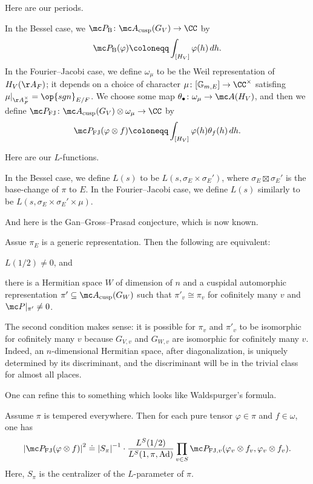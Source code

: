 \documentclass{article}
\begin{document}
Here are our periods.
\begin{definition}
	In the Bessel case, we $\mc P_{\mathrm B}\colon\mc A_{\mathrm{cusp}}(G_V)\to\CC$ by
	\[\mc P_{\mathrm B}(\varphi)\coloneqq\int_{[H_V]}\varphi(h)\,dh.\]
	In the Fourier--Jacobi case, we define $\omega_\mu$ to be the Weil representation of $H_V(\AA_F)$; it depends on a choice of character $\mu\colon[\mathbb G_{m,E}]\to\CC^\times$ satisfing $\mu|_{\AA_F^\times}=\op{sgn}_{E/F}$. We choose some map $\theta_\bullet\colon\omega_\mu\to\mc A(H_V)$, and then we define $\mc P_{\mathrm{FJ}}\colon\mc A_{\mathrm{cusp}}(G_V)\otimes\omega_\mu\to\CC$ by
	\[\mc P_{\mathrm{FJ}}(\varphi\otimes f)\coloneqq\int_{[H_V]}\varphi(h)\theta_f(h)\,dh.\]
\end{definition}
Here are our $L$-functions.
\begin{notation}
	In the Bessel case, we define $L(s)$ to be $L(s,\sigma_E\times\sigma_E')$, where $\sigma_E\boxtimes\sigma_E'$ is the base-change of $\pi$ to $E$. In the Fourier--Jacobi case, we define $L(s)$ similarly to be $L(s,\sigma_E\times\sigma_E'\times\mu)$.
\end{notation}
And here is the Gan--Gross--Prasad conjecture, which is now known.
\begin{theorem}
	Assue $\pi_E$ is a generic representation. Then the following are equivalent:
	\begin{listroman}
		\item $L(1/2)\ne0$, and
		\item there is a Hermitian space $W$ of dimension of $n$ and a cuspidal automorphic representation $\pi'\subseteq\mc A_{\mathrm{cusp}}(G_W)$ such that $\pi'_v\cong\pi_v$ for cofinitely many $v$ and $\mc P|_{\pi'}\ne0$.
	\end{listroman}
\end{theorem}
\begin{remark}
	The second condition makes sense: it is possible for $\pi_v$ and $\pi'_v$ to be isomorphic for cofinitely many $v$ because $G_{V,v}$ and $G_{W,v}$ are isomorphic for cofinitely many $v$. Indeed, an $n$-dimensional Hermitian space, after diagonalization, is uniquely determined by its discriminant, and the discriminant will be in the trivial class for almost all places.
\end{remark}
One can refine this to something which looks like Waldspurger's formula.
\begin{theorem}
	Assume $\pi$ is tempered everywhere. Then for each pure tensor $\varphi\in\pi$ and $f\in\omega$, one has
	\[\left|\mc P_{\mathrm{FJ}}(\varphi\otimes f)\right|^2\doteq\left|S_\pi\right|^{-1}\cdot\frac{L^S(1/2)}{L^S(1,\pi,\mathrm{Ad})}\prod_{v\in S}\mc P_{\mathrm{FJ},v}(\varphi_v\otimes f_v,\varphi_v\otimes f_v).\]
	Here, $S_\pi$ is the centralizer of the $L$-parameter of $\pi$.
\end{theorem}
\end{document}
